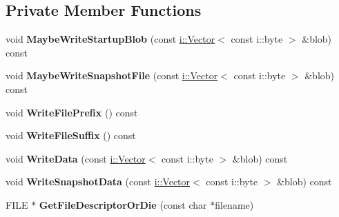 \subsection*{Private Member Functions}
\begin{DoxyCompactItemize}
\item 
void {\bfseries Maybe\+Write\+Startup\+Blob} (const \hyperlink{classv8_1_1internal_1_1_vector}{i\+::\+Vector}$<$ const i\+::byte $>$ \&blob) const \hypertarget{class_snapshot_writer_a667f8d5396dc4cc8413c2dd92e4bf4d1}{}\label{class_snapshot_writer_a667f8d5396dc4cc8413c2dd92e4bf4d1}

\item 
void {\bfseries Maybe\+Write\+Snapshot\+File} (const \hyperlink{classv8_1_1internal_1_1_vector}{i\+::\+Vector}$<$ const i\+::byte $>$ \&blob) const \hypertarget{class_snapshot_writer_a9da24de365b26170c41bba46cb9ed148}{}\label{class_snapshot_writer_a9da24de365b26170c41bba46cb9ed148}

\item 
void {\bfseries Write\+File\+Prefix} () const \hypertarget{class_snapshot_writer_ad88912261c34e339e8066bd264e1f18a}{}\label{class_snapshot_writer_ad88912261c34e339e8066bd264e1f18a}

\item 
void {\bfseries Write\+File\+Suffix} () const \hypertarget{class_snapshot_writer_a38030799e670dbc8e49ddacd3800dfbc}{}\label{class_snapshot_writer_a38030799e670dbc8e49ddacd3800dfbc}

\item 
void {\bfseries Write\+Data} (const \hyperlink{classv8_1_1internal_1_1_vector}{i\+::\+Vector}$<$ const i\+::byte $>$ \&blob) const \hypertarget{class_snapshot_writer_a67d4e72f12d281f410df2a52aa466b26}{}\label{class_snapshot_writer_a67d4e72f12d281f410df2a52aa466b26}

\item 
void {\bfseries Write\+Snapshot\+Data} (const \hyperlink{classv8_1_1internal_1_1_vector}{i\+::\+Vector}$<$ const i\+::byte $>$ \&blob) const \hypertarget{class_snapshot_writer_a1421dfc344fbd3774885d3a80a219ac5}{}\label{class_snapshot_writer_a1421dfc344fbd3774885d3a80a219ac5}

\item 
F\+I\+LE $\ast$ {\bfseries Get\+File\+Descriptor\+Or\+Die} (const char $\ast$filename)\hypertarget{class_snapshot_writer_a1ccb5417b45e42ebecdd888f41ab5b5b}{}\label{class_snapshot_writer_a1ccb5417b45e42ebecdd888f41ab5b5b}

\end{DoxyCompactItemize}

